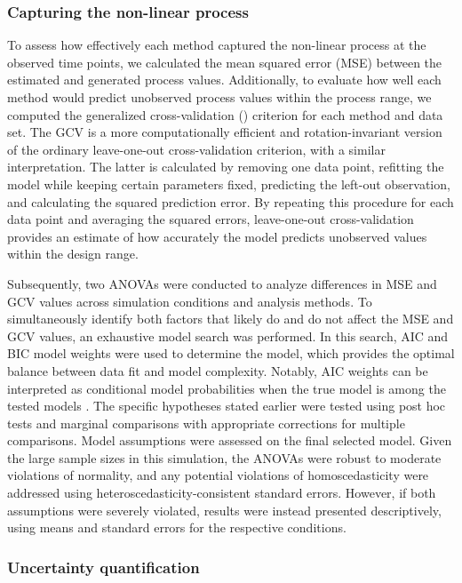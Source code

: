 \documentclass[man, floatsintext]{apa7}
\begin{document}
\subsubsection{Capturing the non-linear process}

To assess how effectively each method captured the non-linear process at the
observed time points, we calculated the mean squared error (MSE) between the
estimated and generated process values. Additionally,
to evaluate how well each method
would predict unobserved process values within the process range, we computed
the generalized cross-validation (\parencite[GCV;][]{golub_generalized_1979})
criterion
for each method and data set. The GCV is a more computationally efficient and
rotation-invariant version of the ordinary leave-one-out cross-validation
criterion, with a similar interpretation. The latter is calculated by removing
one data point, refitting the
model while keeping certain parameters fixed, predicting the left-out
observation, and calculating the squared
prediction error. By repeating this procedure for each data point and averaging
the squared errors, leave-one-out cross-validation provides an estimate of
how accurately the model
predicts unobserved values within the design range.

Subsequently, two ANOVAs were conducted to analyze differences in MSE and GCV
values across simulation conditions and analysis methods. To simultaneously
identify both factors that likely
do and do not affect the MSE and GCV values, an exhaustive model search was
performed. In this search, AIC and BIC model weights were used to determine the
model, which provides the optimal balance between data fit and model
complexity. Notably, AIC weights can
be interpreted as conditional model probabilities when the true model is among
the tested models \parencite{wagenmakers_aic_2004}. The specific hypotheses
stated earlier
were tested using post hoc tests and marginal comparisons with appropriate
corrections for multiple comparisons.
Model assumptions were assessed on the final selected model. Given
the large sample sizes in this simulation, the ANOVAs were robust to moderate
violations of normality, and any potential violations of homoscedasticity were
addressed using heteroscedasticity-consistent standard errors. However, if both
assumptions were severely violated, results were instead presented
descriptively, using means and standard errors for the respective conditions.

\subsubsection{Uncertainty quantification}
\end{document}
